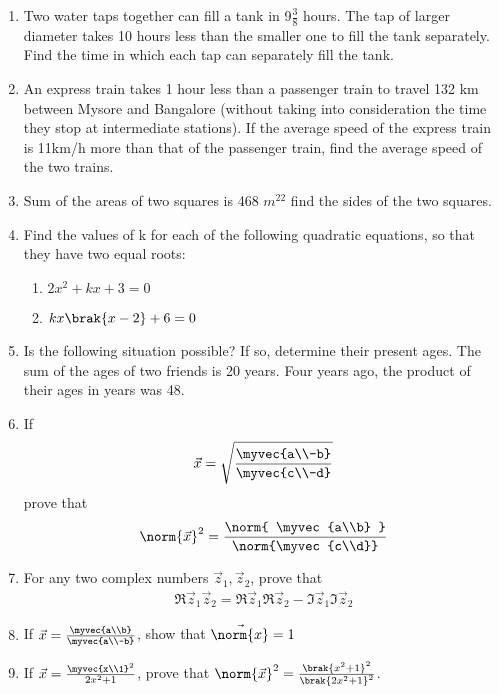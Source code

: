 \begin{enumerate}[label=\arabic*.,ref=\thesubsection.\theenumi]
\item Two water taps together can fill a tank in 9$\frac{3}{ 8}$
hours. The tap of larger diameter takes 10
hours less than the smaller one to fill the tank separately. Find the time in which each tap can separately fill the tank.
\item An express train takes 1 hour less than a passenger train to travel 132 km between Mysore and Bangalore (without taking into consideration the time they stop at intermediate stations). If the average speed of the express train is 11km/h more than that of the passenger train, find the average speed of the two trains.
\item Sum of the areas of two squares is 468 $m^22$ find the sides of the two squares.
\item Find the values of k for each of the following quadratic equations, so that they have two equal roots:
\begin{enumerate}
\item 	$2x^2+kx+3 = 0$
\item 	$kx\brak{x-2}+6= 0$
\end{enumerate}
\item Is the following situation possible? If so, determine their present ages. The sum of the ages of two friends is 20 years. Four years ago, the product of their ages in years was 48.
\item If 
%
\begin{align}
\vec{x} = \sqrt{
\frac{\myvec{a\\-b}}{\myvec{c\\-d}}
}
\end{align}
prove that 
%
\begin{align}
\norm{\vec{x}}^2 = \frac{
\norm{
\myvec{a\\b}
}
}
{
\norm{\myvec{c\\d}}
}
\end{align}
\item For any two complex numbers $\vec{z}_1, \vec{z}_2$, prove that 
%
\begin{align}
\Re{\vec{z}_1\vec{z}_2} = 
\Re{\vec{z}_1}
\Re{\vec{z}_2}-
\Im{\vec{z}_1}
\Im{\vec{z}_2}
\end{align}
\item If $\vec{x} = \frac{\myvec{a\\b}}{\myvec{a\\-b}}$, show that $\vec{\norm{x}} = 1$
%
\item If $\vec{x} = \frac{\myvec{x\\1}^2}{2x^2+1}$, prove that $\norm{\vec{x}}^2 = \frac{\brak{x^2+1}^2}{\brak{2x^2+1}^2}$.

\end{enumerate}
